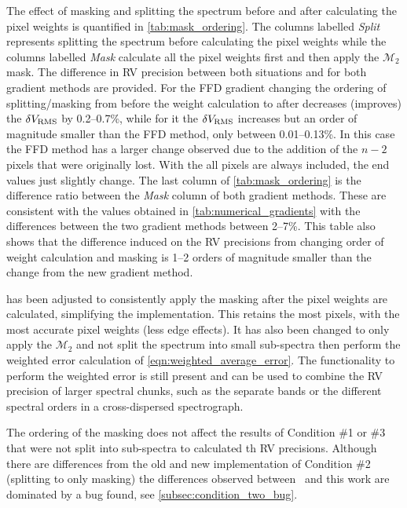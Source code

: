 The effect of masking and splitting the spectrum before and after calculating the pixel weights is quantified in \cref{tab:mask_ordering}.
The columns labelled \emph{Split} represents splitting the spectrum before calculating the pixel weights while the columns labelled \emph{Mask} calculate all the pixel weights first and then apply the \({\mathcal{M}}_{2}\) mask.
The difference in {RV} precision between both situations and for both gradient methods are provided.
For the {FFD} gradient changing the ordering of splitting/masking from before the weight calculation to after decreases (improves) the {\(\delta V_{\textrm{RMS}}\)} by 0.2--0.7\%, while for \npgradient{} it the \(\delta V_{\textrm{RMS}}\) increases but an order of magnitude smaller than the {FFD} method, only between 0.01--0.13\%.
In this case the {FFD} method has a larger change observed due to the addition of the \(n-2\) pixels that were originally lost.
With the \npgradient{} all pixels are always included, the end values just slightly change.
The last column of \cref{tab:mask_ordering} is the difference ratio between the \emph{Mask} column of both gradient methods.
These are consistent with the values obtained in \cref{tab:numerical_gradients} with the differences between the two gradient methods between 2--7\%.
This table also shows that the difference induced on the {RV} precisions from changing order of weight  calculation and masking is 1--2 orders of magnitude smaller than the change from the new gradient method.

\Eniric{} has been adjusted to consistently apply the masking after the pixel weights are calculated, simplifying the implementation.
This retains the most pixels, with the most accurate pixel weights (less edge effects).
It has also been changed to only apply the \({\mathcal{M}}_{2}\) and not split the spectrum into small sub-spectra then perform the weighted error calculation of \cref{eqn:weighted_average_error}.
The functionality to perform the weighted error is still present and can be used to combine the {RV} precision of larger spectral chunks, such as the separate \nir{} bands or the different spectral orders in a cross-dispersed spectrograph.



The ordering of the masking does not affect the results of Condition \#1 or \#3 that were not split into sub-spectra to calculated th RV precisions.
Although there are differences from the old and new implementation of Condition \#2 (splitting to only masking) the differences observed between~\citet{figueira_radial_2016} and this work are dominated by a bug found, see \cref{subsec:condition_two_bug}.


